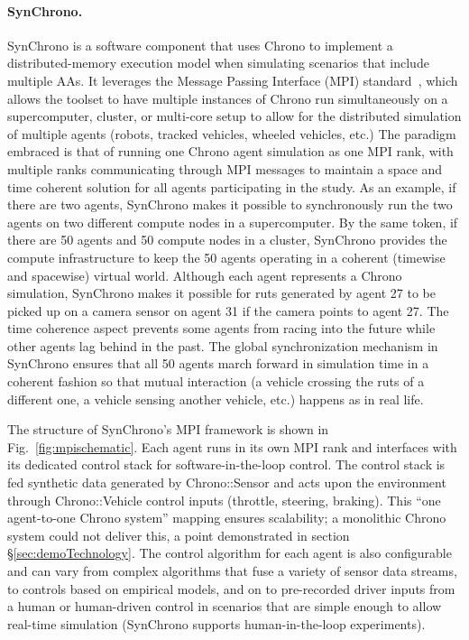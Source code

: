 \documentclass[12pt,twocolumn]{article}
\begin{document}
\paragraph{SynChrono.} SynChrono is a software component that uses Chrono to implement a distributed-memory execution model when simulating scenarios that include multiple AAs. It leverages the Message Passing Interface (MPI) standard~\cite{mpi-3.0}, which allows the toolset to have multiple instances of Chrono run simultaneously on a supercomputer, cluster, or multi-core setup to allow for the distributed simulation of multiple agents (robots, tracked vehicles, wheeled vehicles, etc.) The paradigm embraced is that of running one Chrono agent simulation as one MPI rank, with multiple ranks communicating through MPI messages to maintain a space and time coherent solution for all agents participating in the study. As an example, if there are two agents, SynChrono makes it possible to synchronously run the two agents on two different compute nodes in a supercomputer. By the same token, if there are 50 agents and 50 compute nodes in a cluster, SynChrono provides the compute infrastructure to keep the 50 agents operating in a coherent (timewise and spacewise) virtual world. Although each agent represents a Chrono simulation, SynChrono makes it possible for ruts generated by agent 27 to be picked up on a camera sensor on agent 31 if the camera points to agent 27. The time coherence aspect prevents some agents from racing into the future while other agents lag behind in the past. The global synchronization mechanism in SynChrono ensures that all 50 agents march forward in simulation time in a coherent fashion so that mutual interaction (a vehicle crossing the ruts of a different one, a vehicle sensing another vehicle, etc.) happens as in real life.

The structure of SynChrono's MPI framework is shown in Fig.~\ref{fig:mpischematic}. Each agent runs in its own MPI rank and interfaces with its dedicated control stack for software-in-the-loop control. The control stack is fed synthetic data generated by Chrono::Sensor and acts upon the environment through Chrono::Vehicle control inputs (throttle, steering, braking). This ``one agent-to-one Chrono system'' mapping ensures scalability; a monolithic Chrono system could not deliver this, a point demonstrated in section \S\ref{sec:demoTechnology}. The control algorithm for each agent is also configurable and can vary from complex algorithms that fuse a variety of sensor data streams, to controls based on empirical models, and on to pre-recorded driver inputs from a human or human-driven control in scenarios that are simple enough to allow real-time simulation (SynChrono supports human-in-the-loop experiments). 
\end{document}

